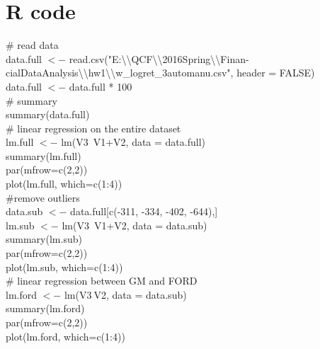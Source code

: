 \documentclass[11pt, conference]{IEEEtran}
\begin{document}
\vfill
\section{R code}
\# read data \\
data.full $<-$ read.csv("E:\textbackslash\textbackslash QCF\textbackslash\textbackslash 2016Spring\textbackslash\textbackslash Finan-cialDataAnalysis\textbackslash\textbackslash hw1\textbackslash\textbackslash w\_logret\_3automanu.csv", header = FALSE) \\
data.full $<-$ data.full * 100 \\

\# summary \\
summary(data.full) \\

\# linear regression on the entire dataset \\
lm.full $<-$ lm(V3~V1+V2, data = data.full) \\
summary(lm.full) \\
par(mfrow=c(2,2))	 \\
plot(lm.full, which=c(1:4)) \\

\#remove outliers \\
data.sub $<-$ data.full[c(-311, -334, -402, -644),] \\
lm.sub $<-$ lm(V3~V1+V2, data = data.sub) \\
summary(lm.sub) \\
par(mfrow=c(2,2)) \\
plot(lm.sub, which=c(1:4)) \\

\# linear regression between GM and FORD \\
lm.ford $<-$ lm(V3$~$V2, data = data.sub) \\
summary(lm.ford) \\
par(mfrow=c(2,2)) \\
plot(lm.ford, which=c(1:4)) \\



\end{document}
